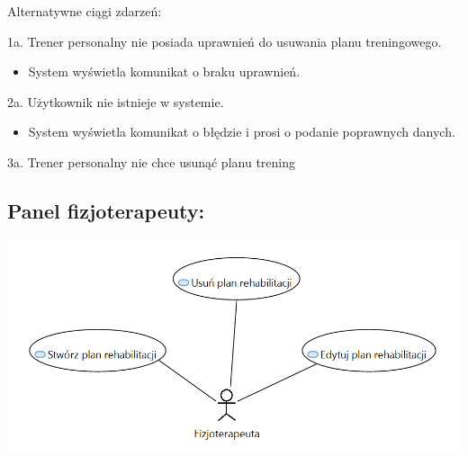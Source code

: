\documentclass[
]{article}
\providecommand{\tightlist}{%
  \setlength{\itemsep}{0pt}\setlength{\parskip}{0pt}}
\begin{document}
{Alternatywne ciągi zdarzeń:}

{1a. Trener personalny nie posiada uprawnień do usuwania planu
treningowego.}

\begin{itemize}
\tightlist
\item
  {System wyświetla komunikat o braku uprawnień.}
\end{itemize}

{2a. Użytkownik nie istnieje w systemie.}

\begin{itemize}
\tightlist
\item
  {System wyświetla komunikat o błędzie i prosi o podanie poprawnych
  danych.}
\end{itemize}

{3a. Trener personalny nie chce usunąć planu trening}

{}

\hypertarget{h.tqqay39z8oku}{%
\subsection{\texorpdfstring{{}}{}}\label{h.tqqay39z8oku}}

{}

\hypertarget{h.vpvz4pfg93q6}{%
\subsection{\texorpdfstring{{}}{}}\label{h.vpvz4pfg93q6}}

{}

{}

{}

{}

{}

{}

{}

{}

{}

{}

\hypertarget{h.hgrtio46fsci}{%
\subsection{\texorpdfstring{{Panel
fizjoterapeuty:}}{Panel fizjoterapeuty:}}\label{h.hgrtio46fsci}}

{\includegraphics{diagrams/use_cases/fizjoterapeuta.png}}
\end{document}
